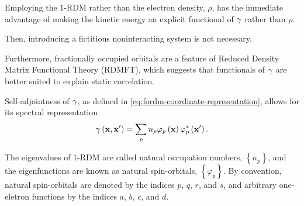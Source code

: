 Employing the 1-RDM rather than the electron density, $\rho$, has the immediate
advantage of making the kinetic energy an explicit functional of $\gamma$ rather
than $\rho$.

Then, introducing a fictitious noninteracting system is not necessary.

Furthermore, fractionally occupied orbitals are a feature of Reduced Density 
Matrix Functional Theory (RDMFT), which suggests that functionals of $\gamma$ are 
better suited to explain static correlation.

Self-adjointness of $\gamma$, as defined in \cref{eq:fordm-coordinate-representation},
allows for its spectral representation
\begin{equation}
    \gamma \left( \boldsymbol{\mathrm{x}}, \boldsymbol{\mathrm{x}}^{\prime} \right) =
    \sum_{p} n_p 
    \varphi_p \left( \boldsymbol{\mathrm{x}} \right)
    \varphi_p^{*} \left( \boldsymbol{\mathrm{x}}^{\prime} \right)
    .
\end{equation}

The eigenvalues of 1-RDM are called natural occupation numbers,
$\left\{ n_p \right\}$, and the eigenfunctions are known as natural
spin-orbitals, $\left\{ \varphi_p \right\}$.
By convention, natural spin-orbitals are denoted by the indices $p$, $q$, $r$, and $s$, 
and arbitrary one-eletron functions by the indices $a$, $b$, $c$, and $d$. 


